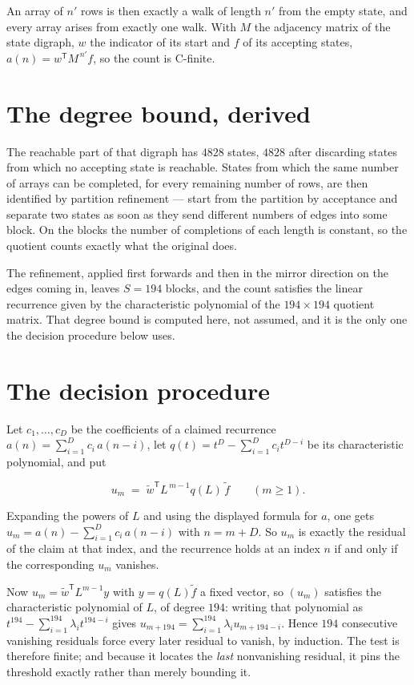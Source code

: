 \documentclass[11pt]{article}
\theoremstyle{definition}
\begin{document}
An array of $n'$ rows is then exactly a walk of length $n'$ from the empty state, and every array arises from exactly one walk. With $M$ the adjacency matrix of the state digraph, $w$ the indicator of its start and $f$ of its accepting states, $a(n) = w^{\mathsf T}M^{\,n'}f$, so the count is C-finite.

\section{The degree bound, derived}

The reachable part of that digraph has $4828$ states, $4828$ after discarding states from which no accepting state is reachable. States from which the same number of arrays can be completed, for every remaining number of rows, are then identified by partition refinement --- start from the partition by acceptance and separate two states as soon as they send different numbers of edges into some block. On the blocks the number of completions of each length is constant, so the quotient counts exactly what the original does.

The refinement, applied first forwards and then in the mirror direction on the edges coming in, leaves $S = 194$ blocks, and the count satisfies the linear recurrence given by the characteristic polynomial of the $194 \times 194$ quotient matrix. That degree bound is computed here, not assumed, and it is the only one the decision procedure below uses.

\section{The decision procedure}

Let $c_1,\dots,c_D$ be the coefficients of a claimed recurrence $a(n) = \sum_{i=1}^{D} c_i\,a(n-i)$, let $q(t) = t^{D} - \sum_{i=1}^{D} c_i t^{D-i}$ be its characteristic polynomial, and put

\[u_m \;=\; \tilde w^{\mathsf T} L^{\,m-1} q(L)\,\tilde f \qquad (m \ge 1).\]

Expanding the powers of $L$ and using the displayed formula for $a$, one gets $u_m = a(n) - \sum_{i=1}^{D} c_i\,a(n-i)$ with $n = m + D$. So $u_m$ is exactly the residual of the claim at that index, and the recurrence holds at an index $n$ if and only if the corresponding $u_m$ vanishes.

Now $u_m = \tilde w^{\mathsf T} L^{m-1} y$ with $y = q(L)\tilde f$ a fixed vector, so $(u_m)$ satisfies the characteristic polynomial of $L$, of degree $194$: writing that polynomial as $t^{194} - \sum_{i=1}^{194} \lambda_i t^{194-i}$ gives $u_{m+194} = \sum_{i=1}^{194} \lambda_i u_{m+194-i}$. Hence $194$ consecutive vanishing residuals force every later residual to vanish, by induction. The test is therefore finite; and because it locates the {\itshape last} nonvanishing residual, it pins the threshold exactly rather than merely bounding it.
\end{document}
